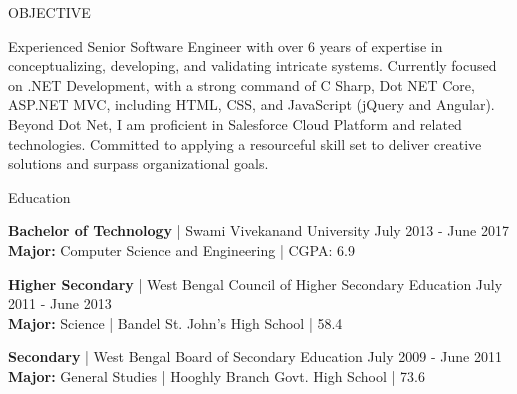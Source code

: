 \documentclass[11pt]{resume}
\begin{document}

    \begin{rSection}{OBJECTIVE}

    {Experienced Senior Software Engineer with over 6 years of expertise in conceptualizing, developing, and validating intricate systems. Currently focused on .NET Development, with a strong command of C Sharp, Dot NET Core, ASP.NET MVC, including HTML, CSS, and JavaScript (jQuery and Angular). Beyond Dot Net, I am proficient in Salesforce Cloud Platform and related technologies. Committed to applying a resourceful skill set to deliver creative solutions and surpass organizational goals.}


    \end{rSection}

    \begin{rSection}{Education}

    {\bf Bachelor of Technology} | Swami Vivekanand University \hfill {July 2013 - June 2017}\\
    \textbf{Major:} Computer Science and Engineering | CGPA: 6.9

        {\bf Higher Secondary} | West Bengal Council of Higher Secondary Education \hfill {July 2011 - June 2013}\\
    \textbf{Major:} Science | Bandel St. John's High School | 58.4%

        {\bf Secondary} | West Bengal Board of Secondary Education \hfill {July 2009 - June 2011}\\
    \textbf{Major:} General Studies | Hooghly Branch Govt. High School | 73.6%



    \end{rSection}
\end{document}
